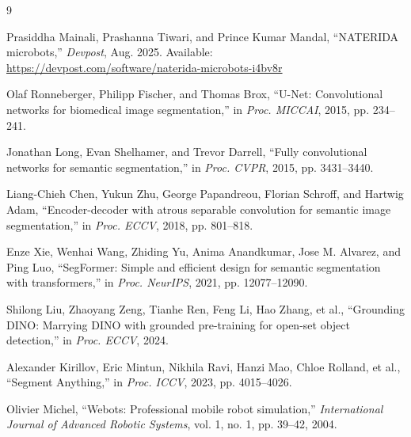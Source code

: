 \documentclass[12pt,a4paper]{article}
\begin{document}
\begin{thebibliography}{9}

Prasiddha Mainali, Prashanna Tiwari, and Prince Kumar Mandal,
\newblock ``NATERIDA microbots,''
\newblock \emph{Devpost}, Aug. 2025.
\newblock Available: \url{https://devpost.com/software/naterida-microbots-i4bv8r}

Olaf Ronneberger, Philipp Fischer, and Thomas Brox,
\newblock ``U-Net: Convolutional networks for biomedical image segmentation,''
\newblock in \emph{Proc. MICCAI}, 2015, pp. 234--241.

Jonathan Long, Evan Shelhamer, and Trevor Darrell,
\newblock ``Fully convolutional networks for semantic segmentation,''
\newblock in \emph{Proc. CVPR}, 2015, pp. 3431--3440.

Liang-Chieh Chen, Yukun Zhu, George Papandreou, Florian Schroff, and Hartwig Adam,
\newblock ``Encoder-decoder with atrous separable convolution for semantic image segmentation,''
\newblock in \emph{Proc. ECCV}, 2018, pp. 801--818.

Enze Xie, Wenhai Wang, Zhiding Yu, Anima Anandkumar, Jose M. Alvarez, and Ping Luo,
\newblock ``SegFormer: Simple and efficient design for semantic segmentation with transformers,''
\newblock in \emph{Proc. NeurIPS}, 2021, pp. 12077--12090.

Shilong Liu, Zhaoyang Zeng, Tianhe Ren, Feng Li, Hao Zhang, et al.,
\newblock ``Grounding DINO: Marrying DINO with grounded pre-training for open-set object detection,''
\newblock in \emph{Proc. ECCV}, 2024.

Alexander Kirillov, Eric Mintun, Nikhila Ravi, Hanzi Mao, Chloe Rolland, et al.,
\newblock ``Segment Anything,''
\newblock in \emph{Proc. ICCV}, 2023, pp. 4015--4026.

Olivier Michel,
\newblock ``Webots: Professional mobile robot simulation,''
\newblock \emph{International Journal of Advanced Robotic Systems}, vol. 1, no. 1, pp. 39--42, 2004.

\end{thebibliography}
\end{document}
